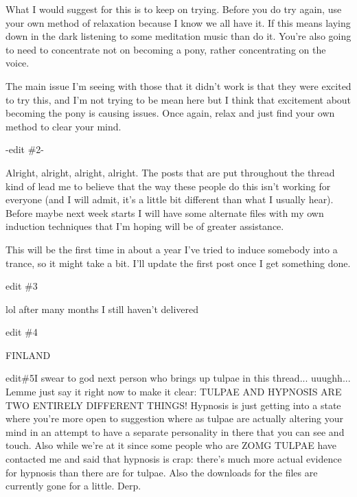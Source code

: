 \documentclass[ebook,12pt,oneside,openany]{memoir}
\begin{document}
\begin{tcolorbox}[title=Lord Bababa,colback=red!5!white,colframe=red!75!black,coltitle=white]
{}\newline{}
\par{\textcolor[RGB]{40,40,40}{What I would suggest for this is to keep on trying. Before you do try again, use your own method of relaxation because I know we all have it. If this means laying down in the dark listening to some meditation music than do it. You're also going to need to concentrate not on becoming a pony, rather concentrating on the voice.}
}\newline{}
\par{\textcolor[RGB]{40,40,40}{The main issue I'm seeing with those that it didn't work is that they were excited to try this, and I'm not trying to be mean here but I think that excitement about becoming the pony is causing issues. Once again, relax and just find your own method to clear your mind.}
}\newline{}
\par{\textcolor[RGB]{40,40,40}{-edit \#2-}
}\newline{}
\par{Alright, alright, alright, alright. The posts that are  put throughout the thread kind of lead me to believe that the way these people do this isn't working for everyone (and I will admit, it's a little bit different than what I usually hear). Before maybe next week starts I will have some alternate files with my own induction techniques that I'm hoping will be of greater assistance.}
\newline{}
\par{This will be the first time in about a year I've tried to induce somebody into a trance, so it might take a bit. I'll update the first post once I get something done.}
\newline{}
\par{edit \#3}
\par{lol after many months I still haven't delivered}
\newline{}
\par{edit \#4}
\par{FINLAND}
\newline{}
\par{edit\#5I swear to god next person who brings up tulpae in this thread... uuughh... Lemme just say it right now to make it clear: TULPAE AND HYPNOSIS ARE TWO ENTIRELY DIFFERENT THINGS! Hypnosis is just getting into a state where you're more open to suggestion where as tulpae are actually altering your mind in an attempt to have a separate personality in there that you can see and touch. Also while we're at it since some people who are ZOMG TULPAE have contacted me and said that hypnosis is crap: there's much more actual evidence for hypnosis than there are for tulpae.\newline{}
\newline{}
Also the downloads for the files are currently gone for a little. Derp.}
\end{tcolorbox}
\end{document}
